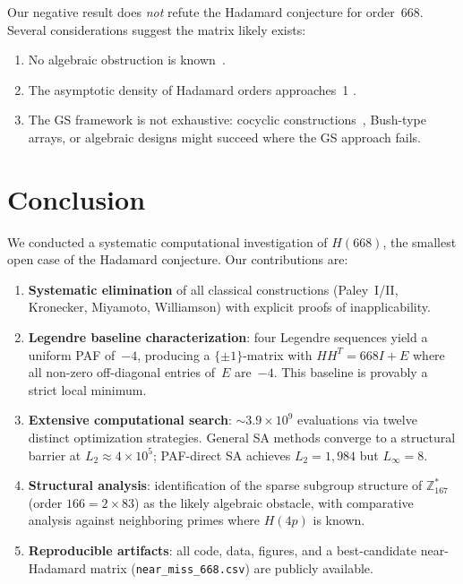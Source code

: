 \documentclass[11pt,a4paper]{article}
\newcommand{\ZZ}{\mathbb{Z}}
\newcommand{\Linf}{L_\infty}
\newcommand{\Ltwo}{L_2}
\begin{document}
Our negative result does \emph{not} refute the Hadamard conjecture for
order~668.  Several considerations suggest the matrix likely exists:
\begin{enumerate}
  \item No algebraic obstruction is
    known~\cite{eliahou2025modular,delauney2010density}.
  \item The asymptotic density of Hadamard orders approaches~1
    \cite{delauney2010density,delauney2009asymptotic}.
  \item The GS framework is not exhaustive: cocyclic
    constructions~\cite{delauney2011flannery,horadam2007hadamard},
    Bush-type arrays, or algebraic designs might succeed where the GS
    approach fails.
\end{enumerate}

\section{Conclusion}\label{sec:conclusion}

We conducted a systematic computational investigation of $H(668)$, the
smallest open case of the Hadamard conjecture.  Our contributions are:

\begin{enumerate}
  \item \textbf{Systematic elimination} of all classical constructions
    (Paley~I/II, Kronecker, Miyamoto, Williamson) with explicit proofs of
    inapplicability.
  \item \textbf{Legendre baseline characterization}: four Legendre
    sequences yield a uniform PAF of~$-4$, producing a $\{\pm1\}$-matrix
    with $HH^T = 668I + E$ where all non-zero off-diagonal entries
    of~$E$ are~$-4$.  This baseline is provably a strict local minimum.
  \item \textbf{Extensive computational search}: $\sim\!3.9 \times 10^9$
    evaluations via twelve distinct optimization strategies.  General SA
    methods converge to a structural barrier at $\Ltwo \approx 4 \times
    10^5$; PAF-direct SA achieves $\Ltwo = 1{,}984$ but $\Linf = 8$.
  \item \textbf{Structural analysis}: identification of the sparse
    subgroup structure of $\ZZ_{167}^*$ (order $166 = 2 \times 83$) as
    the likely algebraic obstacle, with comparative analysis against
    neighboring primes where $H(4p)$ is known.
  \item \textbf{Reproducible artifacts}: all code, data, figures, and a
    best-candidate near-Hadamard matrix (\texttt{near\_miss\_668.csv})
    are publicly available.
\end{enumerate}
\end{document}
